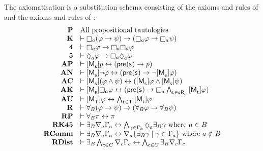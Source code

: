 \begin{definition}\label{raml-k45-axiomatisation}
The axiomatisation \axiomRamlKFF{} is a substitution schema consisting of the axioms and rules of \axiomAmlKFF{} and the axioms and rules of \axiomRmlKFF{}:
$$
\begin{array}{rl}
    {\bf P}     & \text{All propositional tautologies}\\
    {\bf K}     & \proves \necessaryA (\phi \implies \psi) \implies (\necessaryA \phi \implies \necessaryA \psi)\\
    {\bf 4}     & \proves \necessaryA \phi \implies \necessaryA \necessaryA \phi\\
    {\bf 5}     & \proves \possibleA \phi \implies \necessaryA \possibleA \phi\\
    {\bf AP} & \proves \actionA{\aPModel{\aStateS}} \atomP \iff (\aPrecondition(\aStateS) \implies \atomP)\\
    {\bf AN} & \proves \actionA{\aPModel{\aStateS}} \lnot \phi \iff (\aPrecondition(\aStateS) \implies \lnot \actionA{\aPModel{\aStateS}} \phi)\\
    {\bf AC} & \proves \actionA{\aPModel{\aStateS}} (\phi \land \psi) \iff (\actionA{\aPModel{\aStateS}} \phi \land \actionA{\aPModel{\aStateS}} \psi)\\
    {\bf AK} & \proves \actionA{\aPModel{\aStateS}} \necessaryA \phi \iff (\aPrecondition(\aStateS) \implies \necessaryA \bigwedge_{\aStateT \in \aSuccessorsA{\aStateS}} \actionA{\aPModel{\aStateT}} \phi)\\
    {\bf AU} & \proves \actionA{\aPModel{\aStatesT}} \phi \iff \bigwedge_{\aStateT \in \aStatesT} \actionA{\aPModel{\aStateT}} \phi\\
    {\bf R} & \proves \allrefsBs (\phi \implies \psi) \implies (\allrefsBs \phi \implies \allrefsBs \psi)\\
    {\bf RP} & \proves \allrefsBs \pi \iff \pi\\
    {\bf RK45} & \proves \somerefsBs \coversA \Gamma_\agentA \iff \bigwedge_{\gamma \in \Gamma_\agentA} \possibleA \somerefsBs \gamma \text{ where } \agentA \in \agentsB\\
    {\bf RComm} & \proves \somerefsBs \coversA \Gamma_\agentA \iff \coversA \{\somerefsBs \gamma \mid \gamma \in \Gamma_\agentA\} \text{ where } \agentA \notin \agentsB\\
    {\bf RDist} & \proves \somerefsBs \bigwedge_{\agentC \in \agentsC} \coversC \Gamma_\agentC \iff \bigwedge_{\agentC \in \agentsC} \somerefsBs \coversC \Gamma_\agentC\\

\end{array}$$
\end{definition}
